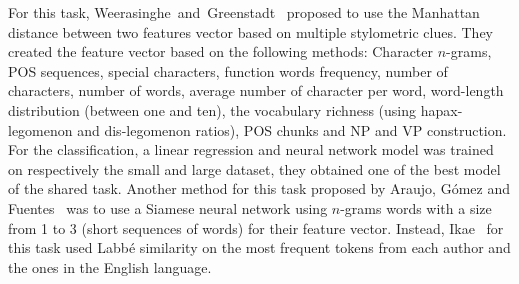 For this task, Weerasinghe~and~Greenstadt~\cite{feature_vector_pan20} proposed to use the Manhattan distance between two features vector based on multiple stylometric clues.
They created the feature vector based on the following methods: Character $n$-grams, POS sequences, special characters, function words frequency, number of characters, number of words, average number of character per word, word-length distribution (between one and ten), the vocabulary richness (using hapax-legomenon and dis-legomenon ratios), POS chunks and NP and VP construction.
For the classification, a linear regression and neural network model was trained on respectively the small and large dataset, they obtained one of the best model of the shared task.
Another method for this task proposed by Araujo, Gómez and Fuentes~\cite{siamese_network_pan20} was to use a Siamese neural network using $n$-grams words with a size from 1 to 3 (short sequences of words) for their feature vector.
Instead, Ikae~\cite{unine_pan20_verif} for this task used Labbé similarity on the most frequent tokens from each author and the ones in the English language.
